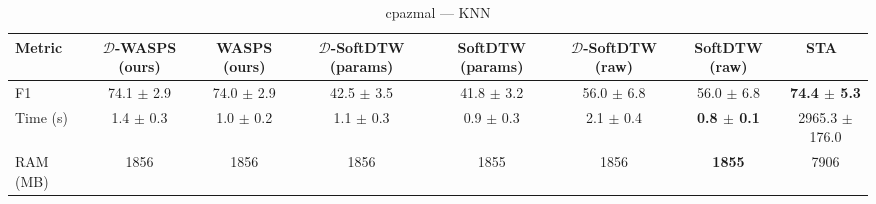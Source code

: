 \begin{table}[htbp]
\centering
\begin{NiceTabular}{lccccccc}
\toprule
Metric & $\mathcal{D}$-WASPS (ours) & WASPS (ours) & $\mathcal{D}$-SoftDTW (params) & SoftDTW (params) & $\mathcal{D}$-SoftDTW (raw) & SoftDTW (raw) & STA~\cite{janati2020spatio} \\
\midrule
F1 & 74.1 $\pm$ 2.9 & 74.0 $\pm$ 2.9 & 42.5 $\pm$ 3.5 & 41.8 $\pm$ 3.2 & 56.0 $\pm$ 6.8 & 56.0 $\pm$ 6.8 & \textbf{74.4 $\pm$ 5.3} \\
Time (s) & 1.4 $\pm$ 0.3 & 1.0 $\pm$ 0.2 & 1.1 $\pm$ 0.3 & 0.9 $\pm$ 0.3 & 2.1 $\pm$ 0.4 & \textbf{0.8 $\pm$ 0.1} & 2965.3 $\pm$ 176.0 \\
RAM (MB) & 1856 & 1856 & 1856 & 1855 & 1856 & \textbf{1855} & 7906 \\
\bottomrule
\end{NiceTabular}
\caption{cpazmal --- KNN}
\label{tab:exp1_cpazmal_knn}
\end{table}
